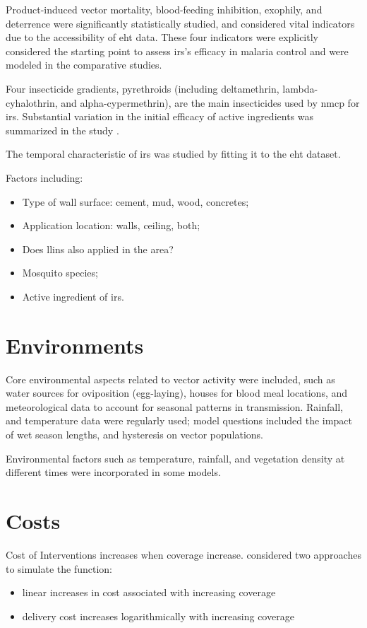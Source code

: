 \documentclass[a4paper, 12pt, twoside]{article}
\begin{document}
Product-induced vector mortality, blood-feeding inhibition, exophily, and deterrence were significantly statistically studied, and considered vital indicators due to the accessibility of \gls{eht} data.
These four indicators were explicitly considered the starting point to assess \gls{irs}'s efficacy in malaria control and were modeled in the comparative studies.

Four insecticide gradients, pyrethroids (including deltamethrin, lambda-cyhalothrin, and alpha-cypermethrin), are the main insecticides used by \gls{nmcp} for \gls{irs}.
Substantial variation in the initial efficacy of active ingredients was summarized in the study \cite{Sherrard-Smith2018b}.

The temporal characteristic of \gls{irs} was studied by fitting it to the \gls{eht} dataset.

Factors including:
\begin{itemize}
  \item Type of wall surface: cement, mud, wood, concretes;
  \item Application location: walls, ceiling, both;
  \item Does \gls{llins} also applied in the area?
  \item Mosquito species;
  \item Active ingredient of \gls{irs}.
\end{itemize}

\section{Environments}%
\label{sec:environments}
Core environmental aspects related to vector activity were included, such as water sources for oviposition (egg-laying)\cite{Bomblies2008}, houses for blood meal locations\cite{Gu2009a}, and meteorological data to account for seasonal patterns in transmission\cite{Depinay2004}.
Rainfall, and temperature data were regularly used; model questions included the impact of wet season lengths\cite{Endo2016a}, and hysteresis\cite{Yamana2017} on vector populations.

Environmental factors such as temperature, rainfall, and vegetation density\cite{Gomez-Elipe2007} at different times were incorporated in some models.


\section{Costs}
Cost of Interventions increases when coverage increase.\cite{Winskill2017a} considered two approaches to simulate the function:
\begin{itemize}
	\item linear increases in cost associated with increasing coverage
	\item delivery cost increases logarithmically with increasing coverage
\end{itemize}
\end{document}
